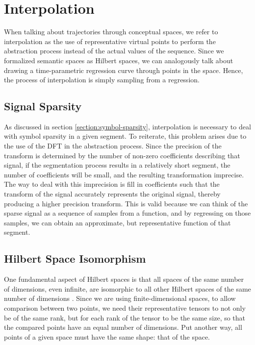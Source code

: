 \section{Interpolation}
\label{section:interpolation}

When talking about trajectories through conceptual spaces, we refer to interpolation as the use of representative virtual points to perform the abstraction process instead of the actual values of the sequence.  Since we formalized semantic spaces as Hilbert spaces, we can analogously talk about drawing a time-parametric regression curve through points in the space.  Hence, the process of interpolation is simply sampling from a regression.

\subsection{Signal Sparsity}
\label{section:signal-sparsity}

As discussed in section \ref{section:symbol-sparsity}, interpolation is necessary to deal with symbol sparsity in a given segment.  To reiterate, this problem arises due to the use of the DFT in the abstraction process.  Since the precision of the transform is determined by the number of non-zero coefficients describing that signal, if the segmentation process results in a relatively short segment, the number of coefficients will be small, and the resulting transformation imprecise.  The way to deal with this imprecision is fill in coefficients such that the transform of the signal accurately represents the original signal, thereby producing a higher precision transform.  This is valid because we can think of the sparse signal as a sequence of samples from a function, and by regressing on those samples, we can obtain an approximate, but representative function of that segment.

\subsection{Hilbert Space Isomorphism}
\label{section:hilbert-space-isomorphism}

One fundamental aspect of Hilbert spaces is that all spaces of the same number of dimensions, even infinite, are isomorphic to all other Hilbert spaces of the same number of dimensions \citep{kennedy2013hilbert}.  Since we are using finite-dimensional spaces, to allow comparison between two points, we need their representative tensors to not only be of the same rank, but for each rank of the tensor to be the same size, so that the compared points have an equal number of dimensions.  Put another way, all points of a given space must have the same shape: that of the space.

